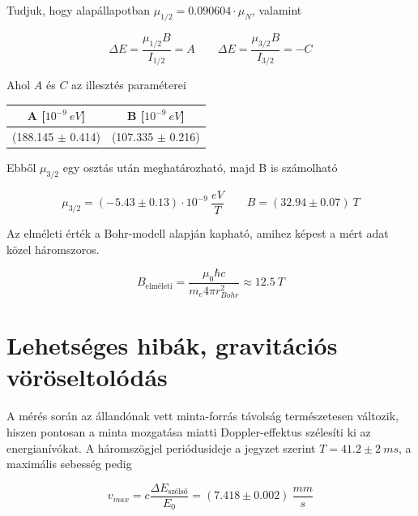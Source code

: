 \documentclass[a4paper,12pt]{article}
\begin{document}
\par Tudjuk, hogy alapállapotban $\mu_{1/2} = 0.090604\cdot \mu_{N}$, valamint 

\begin{equation*}
\Delta E = \frac{\mu_{1/2}B}{I_{1/2}} = A \quad \quad \Delta E = \frac{\mu_{3/2}B}{I_{3/2}} = -C 
\end{equation*}

\par Ahol $A$ és $C$ az illesztés paraméterei

\begin{table}[!h]
\centering
\begin{tabular}{|c|c|} \hline
A [$10^{-9}~eV$] & B [$10^{-9}~eV$] \\ \hline
(188.145 $\pm$ 0.414) & (107.335 $\pm$ 0.216) \\ \hline
\end{tabular}
\end{table}

\par Ebből $\mu_{3/2}$ egy osztás után meghatározható, majd B is számolható

\begin{equation*}
\mu_{3/2} = (-5.43 \pm 0.13) \cdot 10^{-9} ~\frac{eV}{T} \quad \quad B = (32.94 \pm 0.07) ~T
\end{equation*}

\par Az elméleti érték a Bohr-modell alapján kapható, amihez képest a mért adat közel háromszoros.

\begin{equation*}
B_{\text{elméleti}} = \frac{\mu_{0}\hbar c}{m_{e}4\pi r_{Bohr}^{2}} \approx 12.5 ~T
\end{equation*}

\section{Lehetséges hibák, gravitációs vöröseltolódás}

\par A mérés során az állandónak vett minta-forrás távolság természetesen változik, hiszen pontosan a minta mozgatása miatti Doppler-effektus szélesíti ki az energianívókat. A háromszögjel periódusideje a jegyzet szerint $T = 41.2 \pm 2 ~ms$, a maximális sebesség pedig

\begin{equation*}
v_{max} = c \frac{\Delta E_{\text{szélső}}}{E_{0}} = (7.418 \pm 0.002) ~\frac{mm}{s}
\end{equation*}
\end{document}
